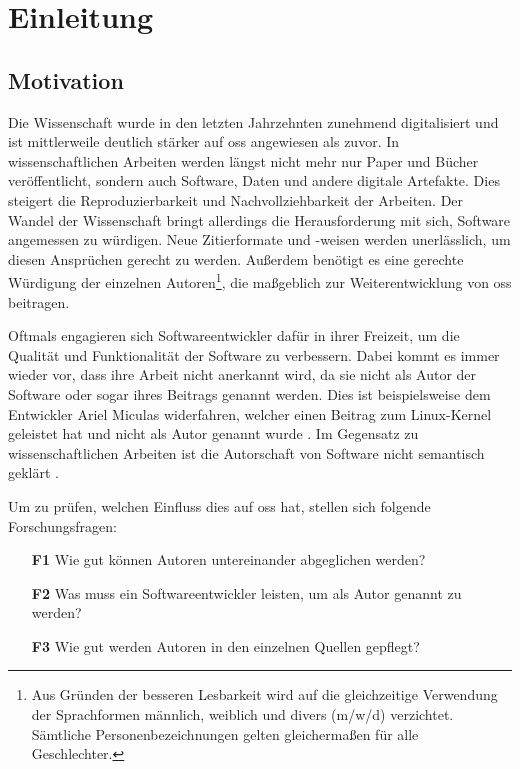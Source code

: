 \chapter{Einleitung}
\label{chap:einleitung}
\section{Motivation}
\label{sec:motivation}
Die Wissenschaft wurde in den letzten Jahrzehnten zunehmend digitalisiert und ist mittlerweile deutlich stärker auf \gls{oss} angewiesen als zuvor.
In wissenschaftlichen Arbeiten werden längst nicht mehr nur Paper und Bücher veröffentlicht, sondern auch Software, Daten und andere digitale Artefakte.
Dies steigert die Reproduzierbarkeit und Nachvollziehbarkeit der Arbeiten.
Der Wandel der Wissenschaft bringt allerdings die Herausforderung mit sich, Software angemessen zu würdigen.
Neue Zitierformate und -weisen werden unerlässlich, um diesen Ansprüchen gerecht zu werden.
Außerdem benötigt es eine gerechte Würdigung der einzelnen Autoren\footnote{Aus Gründen der besseren Lesbarkeit wird auf die gleichzeitige Verwendung der Sprachformen männlich, weiblich und divers (m/w/d) verzichtet. Sämtliche Personenbezeichnungen gelten gleichermaßen für alle Geschlechter.}, die maßgeblich zur Weiterentwicklung von \gls{oss} beitragen.

Oftmals engagieren sich Softwareentwickler dafür in ihrer Freizeit, um die Qualität und Funktionalität der Software zu verbessern.
Dabei kommt es immer wieder vor, dass ihre Arbeit nicht anerkannt wird, da sie nicht als Autor der Software oder sogar ihres Beitrags genannt werden.
Dies ist beispielsweise dem Entwickler Ariel Miculas widerfahren, welcher einen Beitrag zum Linux-Kernel geleistet hat und nicht als Autor genannt wurde \autocite{miculas_how_2023}.
Im Gegensatz zu wissenschaftlichen Arbeiten ist die Autorschaft von Software nicht semantisch geklärt \autocite{schmidt_software_nodate}.

Um zu prüfen, welchen Einfluss dies auf \gls{oss} hat, stellen sich folgende Forschungsfragen:

\begin{itemize}
    \item[\textbf{F1}] Wie gut können Autoren untereinander abgeglichen werden?
    \item[\textbf{F2}] Was muss ein Softwareentwickler leisten, um als Autor genannt zu werden?
    \item[\textbf{F3}] Wie gut werden Autoren in den einzelnen Quellen gepflegt?
\end{itemize}

